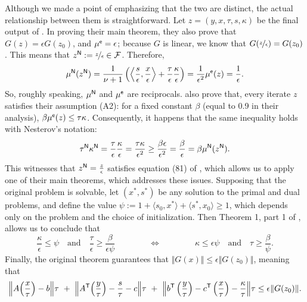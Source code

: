 \begin{subappendices}
\begin{lproof}
    Although we made a point of emphasizing that the two are distinct,
    the actual relationship between them is straightforward.
    Let $z = (y, x,\tau, s, \kappa)$ be the final output of \textcite{badenbroek2021algorithm}.
    In proving their main theorem, they also prove that
    $G(z) = \epsilon G(z_0)$,  and $\mu^{\sf e}=\epsilon$;
    because $G$ is linear, we know that $G(\nicefrac{z}{\epsilon}) = G(z_0)$.
    This means that $z^{\sf N}
    := \nicefrac z\epsilon \in \mathcal F$.
    Therefore,
    \[
        \mu^{\sf N}(z^{\sf N} )
        = \frac{1}{\nu+1} \left( \left\langle\frac{s}{\epsilon}, \frac{x}{\epsilon}\right\rangle + \frac{\tau}{\epsilon} \frac{\kappa}{\epsilon} \right)
    = \frac{1}{\epsilon^2} \mu^{\sf e}(z) = \frac{1}{\epsilon}.
    \]
    So, roughly speaking, $\mu^{\sf N}$ and $\mu^{\sf e}$ are reciprocals.
    \citeauthor*{badenbroek2021algorithm} also
    prove that, every iterate $z$ satisfies their assumption (A2): for a fixed constant $\beta$ (equal to 0.9 in their analysis), $\beta \mu^{\sf e}(z) \le \tau \kappa$.
    Consequently,
    it happens that the same inequality holds with Nesterov's notation:
    \[
        \tau^{\sf N} \kappa^{\sf N} =
        \frac{\tau}{\epsilon} \frac{\kappa}{\epsilon}
            = \frac{\tau\kappa}{\epsilon^2} \ge \frac{\beta \epsilon}{\epsilon^2}
            = \frac\beta\epsilon = \beta \mu^{\sf N}
                (z^{\sf N}).
    \]
    This witnesses that $z^{\sf N} = \frac{z}{\epsilon}$ satisfies equation (81) of \citeauthor{nesterov1996infeasible}, which allows us to apply one of their main theorems, which addresses these issues.
    Supposing that the original problem is solvable,
    let $(x^*, s^*)$ be any solution to the primal and dual problems,
    and define the value $\psi := 1 + \langle s_0, x^*\rangle + \langle s^*, x_0 \rangle \ge 1$,
    which depends only on the problem and the choice of initialization.
    Then Theorem 1, part 1 of \citeauthor*{nesterov1996infeasible}, allows us to conclude that
    \[
        \frac{\kappa}{\epsilon}  \le \psi
        \quad\text{and}\quad
        \frac\tau\epsilon \ge \frac{\beta}{\epsilon\psi}
    \qquad\qquad \iff\qquad\qquad
        \kappa \le \epsilon\psi
        \quad\text{and}\quad \tau \ge \frac\beta\psi.
    \]
    Finally, the original theorem guarantees that
    $\Vert G(x) \Vert \le \epsilon \Vert G(z_0)\Vert$, meaning that
    \[
        \Big\Vert A \Big(\frac x\tau\Big) - b \Big\Vert \tau
        ~+~\Big\Vert A^{\sf T} \Big(\frac y\tau\Big) - \frac{s}\tau - c \Big\Vert \tau
        ~+~\Big\Vert b^{\sf T} \left(\frac{y}{\tau}\right) - c^{\sf T} \left(\frac{x}{\tau}\right) - \frac\kappa\tau \Big\Vert \tau \le \epsilon \Vert G(z_0) \Vert.
\]
\end{lproof}
\end{subappendices}

